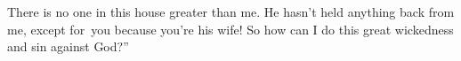 
\begin{inparaenum}
   There is no one in this house greater than me. He hasn't held anything back from me, except for\understood{}\ you because you're his wife! So how can I do this great wickedness and sin against God?''%
\end{inparaenum}
